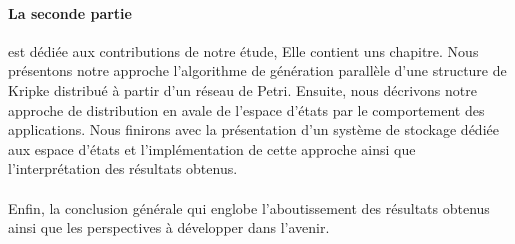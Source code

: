 \paragraph{La seconde partie} est dédiée aux contributions de notre étude, Elle contient uns chapitre.
 Nous présentons notre approche l’algorithme de génération parallèle d'une structure de Kripke distribué à partir d'un réseau de Petri. Ensuite, nous décrivons notre approche de distribution en avale de l'espace d'états par le comportement des applications. Nous finirons avec la présentation d'un système de stockage dédiée aux espace d'états et l’implémentation de cette approche ainsi que l’interprétation des résultats obtenus.
 \\\\
 
 
Enfin, la conclusion générale qui englobe l’aboutissement des résultats obtenus  ainsi que les perspectives à développer dans l’avenir.  

